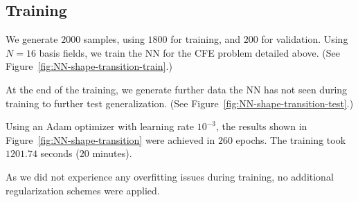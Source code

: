 \subsection*{Training}
We generate $2000$ samples, using $1800$ for training, and $200$ for validation.
Using $N=16$ basis fields, we train the \ac{NN} for the \ac{CFE} problem
detailed above. (See Figure~\ref{fig:NN-shape-transition-train}.)

At the end of the training, we generate further data the \ac{NN} has not seen
during training to further test generalization.
(See Figure~\ref{fig:NN-shape-transition-test}.)

Using an Adam \cite{adam} optimizer with learning rate $10^{-3}$, the results
shown in Figure~\ref{fig:NN-shape-transition} were achieved in $260$ epochs. The
training took $1201.74$ seconds ($20$ minutes).

As we did not experience any overfitting issues during training, no additional
regularization schemes were applied. 

